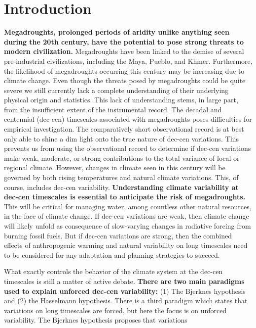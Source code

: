 \documentclass[phd,tocprelim]{cornell}
\begin{document}
\section{Introduction}\label{intro:2}
\par
\textbf{Megadroughts, prolonged periods of aridity unlike anything
seen during the 20th century, have the potential to
pose strong threats to modern civilization.} Megadroughts
have been linked to the demise of several pre-industrial
civilizations, including the Maya, Pueblo, and Khmer. 
Furthermore, the likelihood of megadroughts occurring 
this century may be increasing due to climate change. Even 
though the threats posed by megadroughts could be quite severe 
we still currently lack a complete understanding of their underlying 
physical origin and statistics. This lack of understanding stems, 
in large part, from the insufficient extent of the instrumental
record. The decadal and centennial (dec-cen) timescales associated 
with megadroughts poses difficulties for empirical investigation.  
The comparatively short observational record is at best only 
able to shine a dim light onto the true nature of dec-cen 
variations. This prevents us from using the observational record
to determine if dec-cen variations make weak, moderate, or 
strong contributions to the total variance of local or 
regional climate. However, changes in climate seen in this century 
will be governed by both rising temperatures and natural 
climate variations. This, of course, includes dec-cen variability. 
\textbf{Understanding climate variability at 
dec-cen timescales is essential to anticipate the risk of 
megadroughts.} This will be critical for managing water, among 
countless other natural resources, in the face of climate change. 
If dec-cen variations are weak, then climate change will likely 
unfold as consequence of slow-varying changes in radiative forcing 
from burning fossil fuels. But if dec-cen variations are strong, 
then the combined effects of anthropogenic warming and natural 
variability on long timescales need to be considered for any 
adaptation and planning strategies to succeed.
\par
What exactly controls the behavior of the climate system at the 
dec-cen timescales is still a matter of active debate. 
\textbf{There are two main paradigms used to explain unforced dec-cen 
variability:} (1) The Bjerknes hypothesis and (2) the Hasselmann 
hypothesis. There is a third paradigm which states that variations 
on long timescales are forced, but here the focus is on unforced 
variability. The Bjerknes hypothesis proposes that variations 
\end{document}
